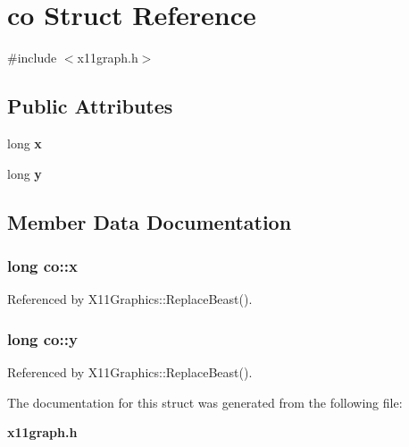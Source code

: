 \section{co Struct Reference}
\label{structco}


{\ttfamily \#include $<$x11graph.\-h$>$}

\subsection*{Public Attributes}
\begin{DoxyCompactItemize}
\item 
long {\bf x}
\item 
long {\bf y}
\end{DoxyCompactItemize}


\subsection{Member Data Documentation}
\subsubsection[{x}]{\setlength{\rightskip}{0pt plus 5cm}long co\-::x}\label{structco_aa2a442cbad252e0913325d91bdca57e9}


Referenced by X11\-Graphics\-::\-Replace\-Beast().

\subsubsection[{y}]{\setlength{\rightskip}{0pt plus 5cm}long co\-::y}\label{structco_a7b2b62fdcde442d48678336b406cac15}


Referenced by X11\-Graphics\-::\-Replace\-Beast().



The documentation for this struct was generated from the following file\-:\begin{DoxyCompactItemize}
\item 
{\bf x11graph.\-h}\end{DoxyCompactItemize}
